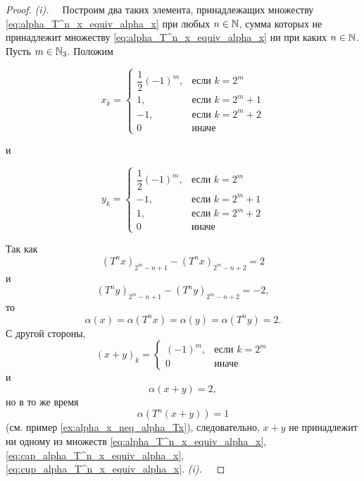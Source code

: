\begin{proof}
	\textit{(i).~~}
	Построим два таких элемента, принадлежащих множеству \eqref{eq:alpha_T^n_x_equiv_alpha_x} при любых $n\in\mathbb{N}$,
	сумма которых не принадлежит множеству \eqref{eq:alpha_T^n_x_equiv_alpha_x} ни при каких $n\in\mathbb{N}$.
	Пусть $m\in\mathbb{N}_3$.
	Положим

	\begin{equation}
		x_k = \begin{cases}
			\dfrac{1}{2}(-1)^m,  & \mbox{если } k = 2^m     \\
			1,                   & \mbox{если } k = 2^m + 1 \\
			-1,                  & \mbox{если } k = 2^m + 2 \\
			0                    & \mbox{иначе }
		\end{cases}
	\end{equation}

	и

	\begin{equation}
		y_k = \begin{cases}
			\dfrac{1}{2}(-1)^m,  & \mbox{если } k = 2^m     \\
			-1,                  & \mbox{если } k = 2^m + 1 \\
			1,                   & \mbox{если } k = 2^m + 2 \\
			0                    & \mbox{иначе }
		\end{cases}
	\end{equation}

	Так как
	\begin{equation}
		(T^n x)_{2^m-n+1} - (T^n x)_{2^m-n+2} = 2
	\end{equation}
	и
	\begin{equation}
		(T^n y)_{2^m-n+1} - (T^n y)_{2^m-n+2} = -2
		,
	\end{equation}
	то
	\begin{equation}
		\alpha(x) = \alpha(T^n x) = \alpha(y) = \alpha(T^n y) = 2
		.
	\end{equation}
	С другой стороны,
	\begin{equation}
		(x+y)_k = \begin{cases}
			(-1)^m,  & \mbox{если } k = 2^m     \\
			0        & \mbox{иначе }
		\end{cases}
	\end{equation}
	и
	\begin{equation}
		\alpha(x+y) = 2
		,
	\end{equation}
	но в то же время
	\begin{equation}
		\alpha(T^n(x+y)) = 1
	\end{equation}
	(см. пример \ref{ex:alpha_x_neq_alpha_Tx}),
	следовательно, $x+y$ не принадлежит ни одному из множеств
	\eqref{eq:alpha_T^n_x_equiv_alpha_x}, \eqref{eq:cap_alpha_T^n_x_equiv_alpha_x}, \eqref{eq:cup_alpha_T^n_x_equiv_alpha_x}.
	\textit{(i).~~}


\end{proof}
